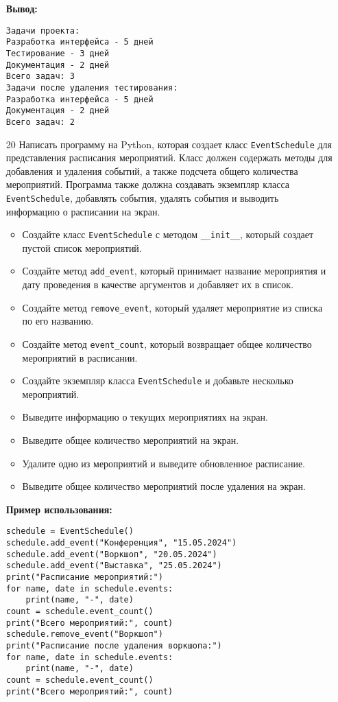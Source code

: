 \begin{enumerate}
\textbf{Вывод:}
\begin{verbatim}
Задачи проекта:
Разработка интерфейса - 5 дней
Тестирование - 3 дней
Документация - 2 дней
Всего задач: 3
Задачи после удаления тестирования:
Разработка интерфейса - 5 дней
Документация - 2 дней
Всего задач: 2
\end{verbatim}

\item[20] Написать программу на Python, которая создает класс \texttt{EventSchedule} для представления расписания мероприятий. Класс должен содержать методы для добавления и удаления событий, а также подсчета общего количества мероприятий. Программа также должна создавать экземпляр класса \texttt{EventSchedule}, добавлять события, удалять события и выводить информацию о расписании на экран.

\begin{itemize}
    \item Создайте класс \texttt{EventSchedule} с методом \texttt{\_\_init\_\_}, который создает пустой список мероприятий.
    \item Создайте метод \texttt{add\_event}, который принимает название мероприятия и дату проведения в качестве аргументов и добавляет их в список.
    \item Создайте метод \texttt{remove\_event}, который удаляет мероприятие из списка по его названию.
    \item Создайте метод \texttt{event\_count}, который возвращает общее количество мероприятий в расписании.
    \item Создайте экземпляр класса \texttt{EventSchedule} и добавьте несколько мероприятий.
    \item Выведите информацию о текущих мероприятиях на экран.
    \item Выведите общее количество мероприятий на экран.
    \item Удалите одно из мероприятий и выведите обновленное расписание.
    \item Выведите общее количество мероприятий после удаления на экран.
\end{itemize}

\textbf{Пример использования:}

\begin{verbatim}
schedule = EventSchedule()
schedule.add_event("Конференция", "15.05.2024")
schedule.add_event("Воркшоп", "20.05.2024")
schedule.add_event("Выставка", "25.05.2024")
print("Расписание мероприятий:")
for name, date in schedule.events:
    print(name, "-", date)
count = schedule.event_count()
print("Всего мероприятий:", count)
schedule.remove_event("Воркшоп")
print("Расписание после удаления воркшопа:")
for name, date in schedule.events:
    print(name, "-", date)
count = schedule.event_count()
print("Всего мероприятий:", count)
\end{verbatim}


\end{enumerate}

